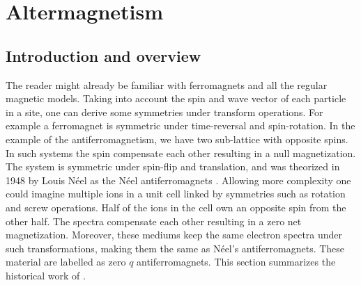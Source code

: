 \documentclass[../main.tex]{main.tex}
\begin{document}
\section{Altermagnetism}
\subsection{Introduction and overview}
The reader might already be familiar with ferromagnets and all the regular magnetic models. Taking into account the spin and
wave vector of each particle in a site, one can derive some symmetries under transform operations. For example a
ferromagnet is symmetric under time-reversal and spin-rotation. In the example of the antiferromagnetism,
we have two sub-lattice with opposite spins. In such systems the spin compensate each other resulting in a null magnetization.
The system is symmetric under spin-flip and translation, and was theorized in 1948 by Louis Néel as the Néel antiferromagnets \cite{Neel1936}.
Allowing more complexity one could imagine multiple ions in a unit cell linked by symmetries such as rotation and screw operations. Half of the ions in the cell
own an opposite spin from the other half. The spectra compensate each other resulting in a zero net magnetization.
Moreover, these mediums keep the same electron spectra under such transformations, making them the same as Néel's antiferromagnets.
These material are labelled as zero $q$ antiferromagnets.
This section summarizes the historical work of \cite{Mazin2024}.\\
\end{document}

